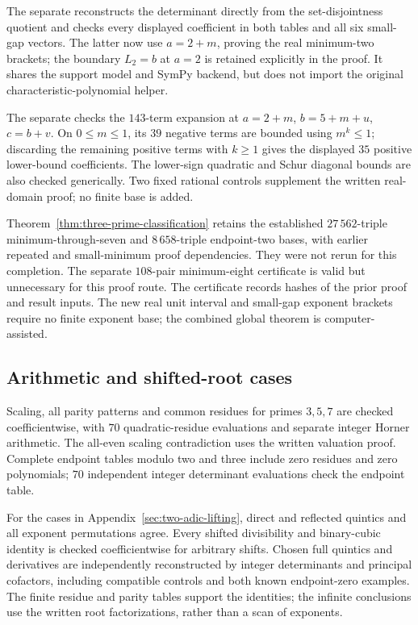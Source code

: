 The separate  reconstructs
the determinant directly from the set-disjointness quotient and checks
every displayed coefficient in both tables and all six small-gap vectors.
The latter now use $a=2+m$, proving the real minimum-two brackets;
the boundary $L_2=b$ at $a=2$ is retained explicitly in the proof.
It shares the support model and SymPy backend, but does not import the
original characteristic-polynomial helper.

The separate  checks
the $143$-term expansion at $a=2+m$, $b=5+m+u$, $c=b+v$.
On $0\leq m\leq1$, its $39$ negative terms are bounded using $m^k\leq1$;
discarding the remaining positive terms with $k\geq1$ gives the displayed
$35$ positive lower-bound coefficients. The lower-sign quadratic and
Schur diagonal bounds are also checked generically. Two fixed rational
controls supplement the written real-domain proof; no finite base is added.

Theorem~\ref{thm:three-prime-classification} retains the established
$27\,562$-triple minimum-through-seven and $8\,658$-triple endpoint-two
bases, with earlier repeated and small-minimum proof dependencies.
They were not rerun for this completion. The separate $108$-pair
minimum-eight certificate is valid but unnecessary for this proof route.
The certificate records hashes of the prior proof and result inputs.
The new real unit interval and small-gap exponent brackets require no
finite exponent base; the combined global theorem is computer-assisted.

\subsection{Arithmetic and shifted-root cases}

Scaling, all parity patterns and common residues for primes $3,5,7$
are checked coefficientwise, with $70$ quadratic-residue evaluations and
separate integer Horner arithmetic. The all-even scaling contradiction
uses the written valuation proof. Complete endpoint tables modulo two
and three include zero residues and zero polynomials; $70$ independent
integer determinant evaluations check the endpoint table.

For the cases in Appendix~\ref{sec:two-adic-lifting}, direct and reflected
quintics and all exponent permutations agree. Every shifted divisibility
and binary-cubic identity is checked coefficientwise for arbitrary shifts.
Chosen full quintics and derivatives are independently reconstructed by
integer determinants and principal cofactors, including compatible controls
and both known endpoint-zero examples. The finite residue and parity tables
support the identities; the infinite conclusions use the written root
factorizations, rather than a scan of exponents.

